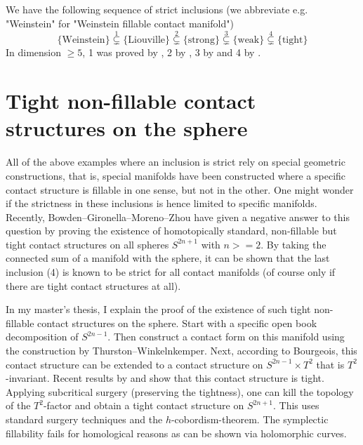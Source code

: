 \documentclass{amsart}
\begin{document}
We have the following sequence of strict inclusions (we abbreviate e.g. "Weinstein" for "Weinstein fillable contact manifold")
\[
      \{\text{Weinstein}\} \overset{1}{\subsetneq} \{\text{Liouville}\} \overset{2}{\subsetneq} \{\text{strong}\} \overset{3}{\subsetneq} \{\text{weak}\} \overset{4}{\subsetneq} \{\text{tight}\}
\]
In dimension $\ge 5$, 1 was proved by \cite[Theorem 1.5]{BCS14}, 2 by \cite{Zhou21}, 3 by \cite{BGM22} and 4 by \cite{MNW13}.



\section*{Tight non-fillable contact structures on the sphere}

All of the above examples where an inclusion is strict rely on special geometric
constructions, that is, special manifolds have been constructed where a specific
contact structure is fillable in one sense, but not in the other.
One might wonder if the strictness in these inclusions is hence limited
to specific manifolds. 
Recently, Bowden--Gironella--Moreno--Zhou \cite{BGMZ22} have given a negative answer to this question by proving the existence of homotopically standard, non-fillable but tight contact structures on all spheres $S^{2n+1}$ with $n >= 2$.
By taking the connected sum of a manifold with the sphere, it can be shown that the last inclusion (4) is known to be strict for all contact manifolds (of course only if there are tight contact structures at all).

In my master's thesis, I explain the proof of the existence of such tight non-fillable contact structures on the sphere.
Start with a specific open book decomposition of $S^{2n-1}$.
Then construct a contact form on this manifold using the construction by Thurston--Winkelnkemper. 
Next, according to Bourgeois, this contact structure can be extended to a contact structure on $S^{2n-1}\times T^2$ that is $T^2$-invariant.
Recent results by \cite{BGM22} and \cite{AZ24} show that this contact structure is tight.
Applying subcritical surgery (preserving the tightness), one can kill the topology of the $T^2$-factor and obtain a tight contact structure on $S^{2n+1}$.
This uses standard surgery techniques and the $h$-cobordism-theorem.
The symplectic fillability fails for homological reasons as can be shown via holomorphic curves. 
\end{document}
